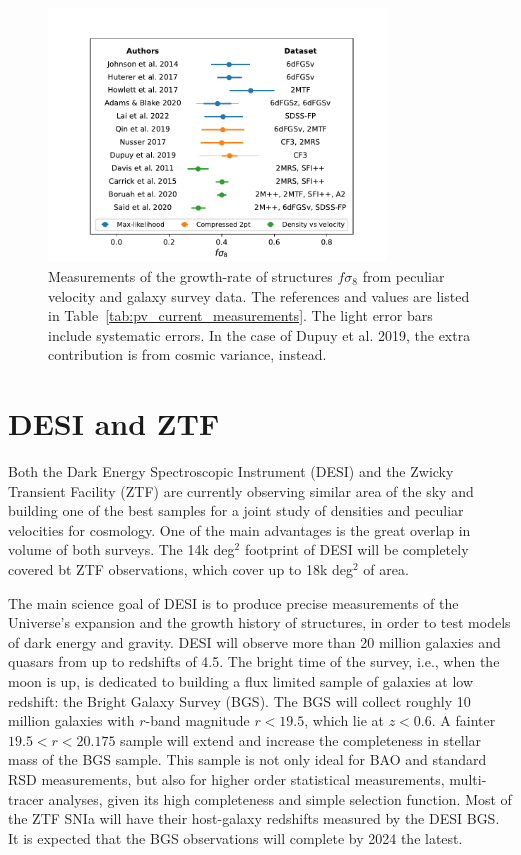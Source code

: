 \begin{figure}[t]
    \centering 
    \includegraphics[width=0.8\textwidth]{fig/velocities/plot_fs8_pv.pdf}
    \caption{Measurements of the growth-rate of structures $f\sigma_8$ from peculiar velocity 
    and galaxy survey data. The references and values are listed in Table~\ref{tab:pv_current_measurements}.
    The light error bars include systematic errors. In the case of Dupuy et al. 2019, the extra contribution 
    is from cosmic variance, instead. }
    \label{fig:pv_current_measurements}
\end{figure}

\section{DESI and ZTF}
\label{velocities:desi_ztf}

Both the Dark Energy Spectroscopic Instrument (DESI) and the Zwicky Transient Facility (ZTF)
are currently observing similar area of the sky and building one of the best samples for a joint study of 
densities and peculiar velocities for cosmology. 
One of the main advantages is the great overlap in volume of both surveys. The 14k deg$^2$ footprint 
of DESI will be completely covered bt ZTF observations, which cover up to 18k deg$^2$ of area. 

The main science goal of DESI is to produce precise measurements of the Universe's expansion and 
the growth history of structures, in order to test models of dark energy and gravity. 
DESI will observe more than 20 million galaxies and quasars from up to redshifts of 4.5. 
The bright time of the survey, i.e., when the moon is up, is dedicated to building a flux limited sample of
galaxies at low redshift: the Bright Galaxy Survey (BGS). The BGS will collect roughly 10 million galaxies 
with $r$-band magnitude $r < 19.5$, which lie at $z < 0.6$. 
A fainter  $19.5<r<20.175$ sample will extend and increase the completeness in stellar mass of the BGS sample. 
This sample is not only ideal for BAO and standard RSD measurements, but also for higher order statistical 
measurements, multi-tracer analyses, given its high completeness and simple selection function. 
Most of the ZTF SNIa will have their host-galaxy redshifts measured by the DESI BGS.
It is expected that the BGS observations will complete by 2024 the latest. 

